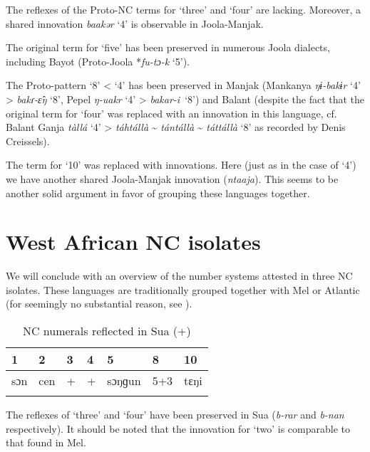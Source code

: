 The reflexes of the Proto-NC terms for ‘three’ and ‘four’ are lacking. Moreover, a shared innovation \textit{baakər} ‘4’ is observable in Joola-Manjak.

The original term for ‘five’ has been preserved in numerous Joola dialects, including Bayot (Proto-Joola *\textit{fu-}\textit{tɔ-}\textit{k} ‘5’).

The Proto-pattern ‘8’ < ‘4’ has been preserved in Manjak (Mankanya \textit{ŋɨ-bakɨr} ‘4’ > \textit{bakɾ-{\^{ɛ}}ŋ} ‘8’, Pepel \textit{ŋ-uakr} ‘4’ > \textit{bakar-i}~‘8’) and Balant (despite the fact that the original term for ‘four’ was replaced with an innovation in this language, cf. Balant Ganja \textit{tàllá} ‘4’ > \textit{táhtállà} {\textasciitilde} \textit{tántállà} {\textasciitilde} \textit{táttállà} ‘8’ as recorded by Denis Creissels).

The term for ‘10’ was replaced with innovations. Here (just as in the case of ‘4’) we have another shared Joola-Manjak innovation (\textit{ntaaja}). This seems to be another solid argument in favor of grouping these languages together.

\clearpage
\section{West African NC isolates}%

We will conclude with an overview of the number systems attested in three NC isolates. These languages are traditionally grouped together with Mel or Atlantic (for seemingly no substantial reason, see \citealt{PozdniakovSegerer2007}).

\begin{table}
\caption{\label{tab:5:13}NC numerals reflected in Sua (+)}


\begin{tabularx}{\textwidth}{lXXXXXX}
\lsptoprule

{1} & {2} & {3} & {4} & {5} & {8} & {10}\\
\midrule 
{sɔ}{n} & {cen} & {+} & {+} & {sɔŋɡ}{un}  & {5+3} & {tɛŋ}{i}\\
\lspbottomrule
\end{tabularx}
\end{table}
The reflexes of ‘three’ and ‘four’ have been preserved in Sua (\textit{b-rar} and \textit{b-nan} respectively). It should be noted that the innovation for ‘two’ is comparable to that found in Mel.

